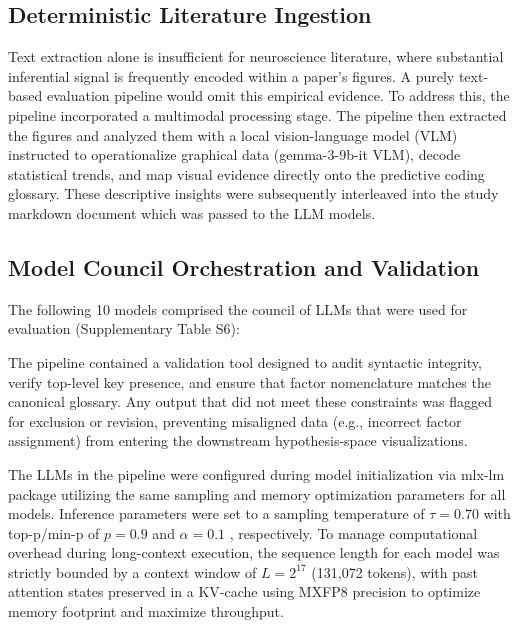 \documentclass[12pt]{article}
\begin{document}
\subsection{Deterministic Literature Ingestion}\label{deterministic-literature-ingestion}

Text extraction alone is insufficient for neuroscience literature, where substantial inferential signal is frequently encoded within a paper's figures. A purely text-based evaluation pipeline would omit this empirical evidence. To address this, the pipeline incorporated a multimodal processing stage. The pipeline then extracted the figures and analyzed them with a local vision-language model (VLM) instructed to operationalize graphical data (gemma-3-9b-it VLM), decode statistical trends, and map visual evidence directly onto the predictive coding glossary. These descriptive insights were subsequently interleaved into the study markdown document which was passed to the LLM models.

\subsection{Model Council Orchestration and Validation}\label{model-council-orchestration-and-validation}

The following 10 models comprised the council of LLMs that were used for evaluation (Supplementary Table S6):




The pipeline contained a validation tool designed to audit syntactic integrity, verify top-level key presence, and ensure that factor nomenclature matches the canonical glossary. Any output that did not meet these constraints was flagged for exclusion or revision, preventing misaligned data (e.g., incorrect factor assignment) from entering the downstream hypothesis-space visualizations.

The LLMs in the pipeline were configured during model initialization via mlx-lm package utilizing the same sampling and memory optimization parameters for all models. Inference parameters were set to a sampling temperature of $\tau = 0.70$ with top-p/min-p of $p = 0.9$ and $\alpha = 0.1$ \cite{ref84} , respectively. To manage computational overhead during long-context execution, the sequence length for each model was strictly bounded by a context window of $L = 2^{17}$ (131,072 tokens), with past attention states preserved in a KV-cache using MXFP8\cite{ref85} precision to optimize memory footprint and maximize throughput.
\end{document}
